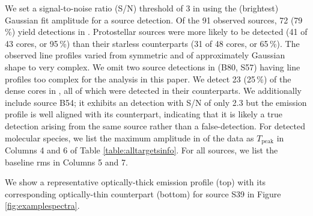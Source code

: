 \documentclass[iop,twocolappendix]{emulateapj}
\begin{document}
We set a signal-to-noise ratio (S/N) threshold of 3 in {\TMB} using the (brightest) Gaussian fit amplitude for a source detection. Of the 91 observed sources, 72 (79\,\%) yield detections in {\HCO}. Protostellar sources were more likely to be detected (41 of 43 cores, or 95\,\%) than their starless counterparts (31 of 48 cores, or 65\,\%). The observed {\HCO} line profiles varied from symmetric and of approximately Gaussian shape to very complex. We omit two source detections in {\HCO} (B80, S57) having line profiles too complex for the analysis in this paper. We detect 23 (25\,\%) of the dense cores in {\NtD}, all of which were detected in their {\HCO} counterparts. We additionally include source B54; it exhibits an {\NtD} detection with S/N of only 2.3 but the emission profile is well aligned with its {\HCO} counterpart, indicating that it is likely a true detection arising from the same source rather than a false-detection. For detected molecular species, we list the maximum amplitude in {\TMB} of the data as $T_\mathrm{peak}$ in Columns 4 and 6 of Table \ref{table:alltargetsinfo}. For all sources, we list the baseline rms in Columns 5 and 7. 


We show a representative optically-thick {\HCO} emission profile (top) with its corresponding optically-thin {\NtD} counterpart (bottom) for source S39 in Figure \ref{fig:examplespectra}. 
\end{document}
